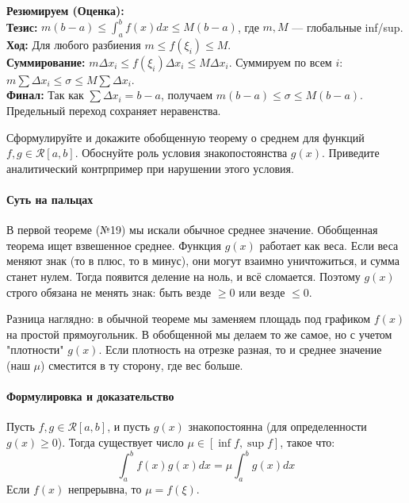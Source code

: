 \begin{tcolorbox}[colback=gray!5, colframe=black, boxrule=0.5pt, arc=0pt]
\textbf{Резюмируем (Оценка):} \\
\textbf{Тезис:} $m(b-a) \le \int_a^b f(x) dx \le M(b-a)$, где $m, M$ — глобальные inf/sup. \\
\textbf{Ход:} Для любого разбиения $m \le f(\xi_i) \le M$. \\
\textbf{Суммирование:} $m \Delta x_i \le f(\xi_i) \Delta x_i \le M \Delta x_i$. Суммируем по всем $i$: \\
$m \sum \Delta x_i \le \sigma \le M \sum \Delta x_i$. \\
\textbf{Финал:} Так как $\sum \Delta x_i = b-a$, получаем $m(b-a) \le \sigma \le M(b-a)$. Предельный переход сохраняет неравенства.
\end{tcolorbox}



{Сформулируйте и докажите обобщенную теорему о среднем для функций $f,g\in\mathcal{R}[a,b]$. Обоснуйте роль условия знакопостоянства $g(x)$. Приведите аналитический контрпример при нарушении этого условия.}

\paragraph{Суть на пальцах}
В первой теореме (№19) мы искали обычное среднее значение. Обобщенная теорема ищет взвешенное среднее. 
Функция $g(x)$ работает как веса. Если веса меняют знак (то в плюс, то в минус), они могут взаимно уничтожиться, и сумма станет нулем. 
Тогда появится деление на ноль, и всё сломается. Поэтому $g(x)$ строго обязана не менять знак: быть везде $\ge 0$ или везде $\le 0$.

Разница наглядно: в обычной теореме мы заменяем площадь под графиком $f(x)$ на простой прямоугольник. В обобщенной мы делаем то же самое, но с учетом "плотности" $g(x)$. Если плотность на отрезке разная, то и среднее значение (наш $\mu$) сместится в ту сторону, где вес больше.

\paragraph{Формулировка и доказательство}
Пусть $f, g \in \mathcal{R}[a, b]$, и пусть $g(x)$ знакопостоянна (для определенности $g(x) \ge 0$). Тогда существует число $\mu \in [\inf f, \sup f]$, такое что:
$$ \int_a^b f(x)g(x)dx = \mu \int_a^b g(x)dx $$
Если $f(x)$ непрерывна, то $\mu = f(\xi)$.

